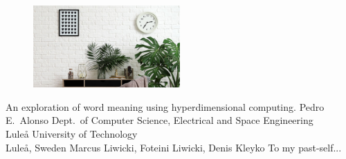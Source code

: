 \documentclass[12pt,a4paper,openright,final,twoside]{cseethesis}
\begin{document}
\def\thesistitle{An exploration of word meaning using hyperdimensional computing.}

\begin{figure}[h]
 \centering
 \includegraphics[width=0.5\textwidth]{bg_wall.jpg}
\end{figure}

\def\theauthor{Pedro E.\ Alonso}
\def\theaddress{Dept.\ of Computer Science, Electrical and Space Engineering\\
Lule{\aa} University of Technology\\ Lule{\aa}, Sweden}

\def\supervisors{Marcus Liwicki, Foteini Liwicki, Denis Kleyko}
\def\supervisorstring{Supervisors: \supervisors} %
\def\dedication{To my past-self...}

\def\theabstract{}
\def\thepreface{}



\def\thelogo{} %


\startpreamble
  {\thesistitle}
  {\theauthor}
  {\theaddress}
  {\supervisors}
  {\dedication}
  {\theabstract}
  {\thepreface}
  {\thelogo}

\end{document}
